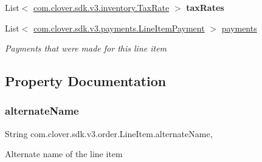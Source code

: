 \begin{DoxyCompactItemize}
List$<$ \hyperlink{classcom_1_1clover_1_1sdk_1_1v3_1_1inventory_1_1_tax_rate}{com.\+clover.\+sdk.\+v3.\+inventory.\+Tax\+Rate} $>$ {\bfseries tax\+Rates}
\item 
List$<$ \hyperlink{classcom_1_1clover_1_1sdk_1_1v3_1_1payments_1_1_line_item_payment}{com.\+clover.\+sdk.\+v3.\+payments.\+Line\+Item\+Payment} $>$ \hyperlink{classcom_1_1clover_1_1sdk_1_1v3_1_1order_1_1_line_item_a4f6f64ae18b773281567764a88ba5ffa}{payments}
\begin{DoxyCompactList}\small\item\em Payments that were made for this line item \end{DoxyCompactList}\end{DoxyCompactItemize}


\subsection{Property Documentation}
\mbox{\label{classcom_1_1clover_1_1sdk_1_1v3_1_1order_1_1_line_item_ad92d1b639e56f340f573b3d8bd606bc2}} 
\subsubsection{\texorpdfstring{alternate\+Name}{alternateName}}
{\footnotesize\ttfamily String com.\+clover.\+sdk.\+v3.\+order.\+Line\+Item.\+alternate\+Name\hspace{0.3cm}{\ttfamily [get]}, {\ttfamily [set]}}



Alternate name of the line item 

\mbox{\label{classcom_1_1clover_1_1sdk_1_1v3_1_1order_1_1_line_item_aaf7ca9189ecde44c059eed82bcfd0c79}} 
